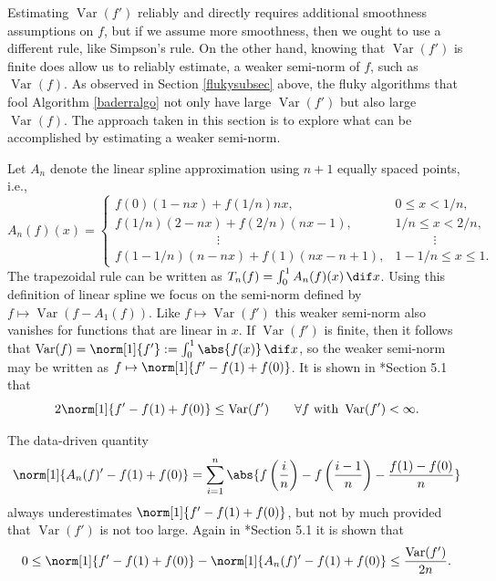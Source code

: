 \documentclass[]{article}
\DeclareMathOperator{\Var}{Var}
\theoremstyle{definition}
\theoremstyle{remark}
\begin{document}
Estimating $\Var(f')$ reliably and directly requires additional smoothness assumptions on $f$, but if we assume more smoothness, then we ought to use a different rule, like Simpson's rule.  On the other hand, knowing that $\Var(f')$ is finite does allow us to reliably estimate, a weaker semi-norm of $f$, such as $\Var(f)$.  As observed in Section \ref{flukysubsec} above, the fluky algorithms that fool Algorithm \ref{baderralgo} not only have large $\Var(f')$ but also large $\Var(f)$.  The approach taken in this section is to explore what can be accomplished by estimating a weaker semi-norm.

Let $A_n$ denote the linear spline approximation using $n+1$ equally spaced points, i.e., 
\begin{equation}
\label{Andef}
A_n(f)(x) = \begin{cases} f(0)(1-nx) + f(1/n)nx, & 0 \le x < 1/n, \\
f(1/n)(2-nx) + f(2/n)(nx-1), & 1/n \le x < 2/n, \\
\qquad \qquad \qquad \qquad \vdots & \qquad \quad \vdots \\
f(1-1/n)(n-nx) + f(1)(nx-n + 1), & 1-1/n \le x \le 1.
\end{cases}
\end{equation}   
The trapezoidal rule can be written as $T_n(f) = \int_0^1 A_n(f)(x) \, \dif x$.  Using this definition of linear spline we focus on the semi-norm defined by $f \mapsto \Var(f-A_1(f))$.  Like $f \mapsto \Var(f')$ this weaker semi-norm also vanishes for functions that are linear in $x$.  If $\Var(f')$ is finite, then it follows that $\Var(f) = \norm[1]{f'}:=\int_0^1 \abs{f(x)} \, \dif x$, so the weaker semi-norm may be written as $f \mapsto \norm[1]{f'-f(1)+f(0)}$.  It is shown in *{Section 5.1} that 
\begin{equation} \label{weaknorm}
2 \norm[1]{f'-f(1)+f(0)} \le \Var(f') \qquad \forall f \text{ with } \Var(f')<\infty.
\end{equation}

The data-driven quantity 
\begin{equation} \label{weaknormalgo}
\norm[1]{A_n(f)'-f(1)+f(0)}= \sum_{i=1}^n \abs{f\left(\frac in \right)-f\left(\frac{i-1}n \right) - \frac{f(1)-f(0)}{n}}
\end{equation}
always underestimates $\norm[1]{f'-f(1)+f(0)}$, but not by much provided that $\Var(f')$ is not too large. Again in *{Section 5.1} it is shown that 
\begin{equation} \label{errweaknorm}
0 \le \norm[1]{f'-f(1)+f(0)} - \norm[1]{A_n(f)'-f(1)+f(0)} \le \frac{\Var(f')}{2n}.
\end{equation}
\end{document}
